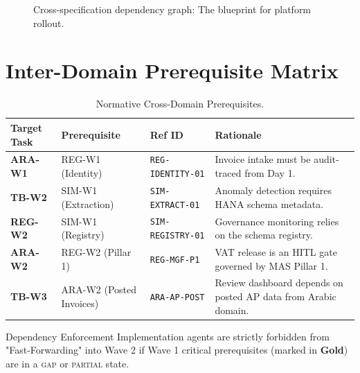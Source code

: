 \documentclass[11pt,a4paper,twoside]{report}
\begin{document}
\begin{figure}[htbp]
\caption{Cross-specification dependency graph: The blueprint for platform rollout.}
\end{figure}

\section{Inter-Domain Prerequisite Matrix}

\begin{table}[htbp]
\centering
\footnotesize
\caption{Normative Cross-Domain Prerequisites.}
\label{tab:prerequisites}
\begin{tabularx}{\textwidth}{@{}l l l X@{}}
\toprule
\textbf{Target Task} & \textbf{Prerequisite} & \textbf{Ref ID} & \textbf{Rationale} \\
\midrule
\rowcolor{sapmidnight!5}
\textbf{ARA-W1} & REG-W1 (Identity) & \texttt{REG-IDENTITY-01} & Invoice intake must be audit-traced from Day 1. \\
\textbf{TB-W2}  & SIM-W1 (Extraction) & \texttt{SIM-EXTRACT-01} & Anomaly detection requires HANA schema metadata. \\
\rowcolor{sapmidnight!5}
\textbf{REG-W2} & SIM-W1 (Registry) & \texttt{SIM-REGISTRY-01} & Governance monitoring relies on the schema registry. \\
\textbf{ARA-W2} & REG-W2 (Pillar 1) & \texttt{REG-MGF-P1} & VAT release is an HITL gate governed by MAS Pillar 1. \\
\rowcolor{sapmidnight!5}
\textbf{TB-W3}  & ARA-W2 (Posted Invoices) & \texttt{ARA-AP-POST} & Review dashboard depends on posted AP data from Arabic domain. \\
\bottomrule
\end{tabularx}
\end{table}

\begin{adrbox}{Dependency Enforcement}
Implementation agents are strictly forbidden from "Fast-Forwarding" into Wave 2 if Wave 1 critical prerequisites (marked in \textcolor{sapamber}{\textbf{Gold}}) are in a \textsc{gap} or \textsc{partial} state.
\end{adrbox}
\end{document}

